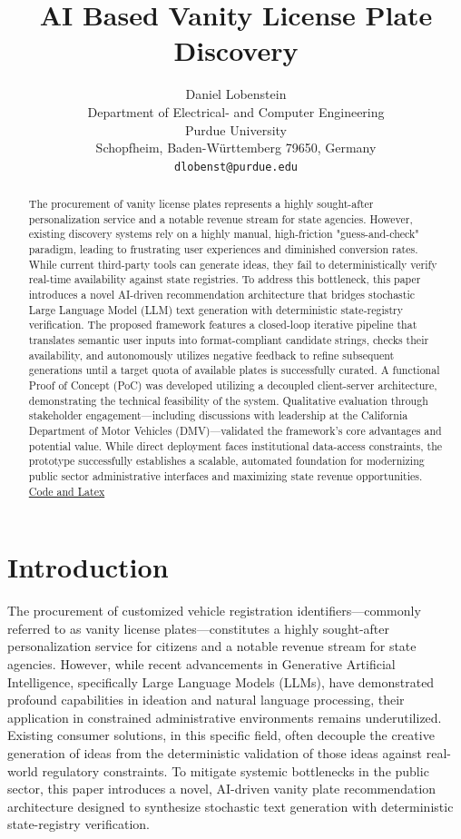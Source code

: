 \documentclass{article} %
\title{AI Based Vanity License Plate Discovery}
\author{Daniel Lobenstein \\
Department of Electrical- and Computer Engineering\\
Purdue University\\
Schopfheim, Baden-Württemberg 79650, Germany \\
\texttt{dlobenst@purdue.edu} 
}
\begin{document}
\maketitle

\begin{abstract}
The procurement of vanity license plates represents a highly sought-after personalization service and a notable revenue stream for state agencies. However, existing discovery systems rely on a highly manual, high-friction "guess-and-check" paradigm, leading to frustrating user experiences and diminished conversion rates. While current third-party tools can generate ideas, they fail to deterministically verify real-time availability against state registries. To address this bottleneck, this paper introduces a novel AI-driven recommendation architecture that bridges stochastic Large Language Model (LLM) text generation with deterministic state-registry verification. The proposed framework features a closed-loop iterative pipeline that translates semantic user inputs into format-compliant candidate strings, checks their availability, and autonomously utilizes negative feedback to refine subsequent generations until a target quota of available plates is successfully curated. A functional Proof of Concept (PoC) was developed utilizing a decoupled client-server architecture, demonstrating the technical feasibility of the system. Qualitative evaluation through stakeholder engagement—including discussions with leadership at the California Department of Motor Vehicles (DMV)—validated the framework's core advantages and potential value. While direct deployment faces institutional data-access constraints, the prototype successfully establishes a scalable, automated foundation for modernizing public sector administrative interfaces and maximizing state revenue opportunities.
\newline
\href{https://github.com/lobendan/ai_project}{Code and Latex}
\end{abstract}

\section{Introduction}

The procurement of customized vehicle registration identifiers—commonly referred to as vanity license plates—constitutes a highly sought-after personalization service for citizens and a notable revenue stream for state agencies. However, while recent advancements in Generative Artificial Intelligence, specifically Large Language Models (LLMs), have demonstrated profound capabilities in ideation and natural language processing, their application in constrained administrative environments remains underutilized.\cite{ai_public_sector} Existing consumer solutions, in this specific field, often decouple the creative generation of ideas from the deterministic validation of those ideas against real-world regulatory constraints. To mitigate systemic bottlenecks in the public sector, this paper introduces a novel, AI-driven vanity plate recommendation architecture designed to synthesize stochastic text generation with deterministic state-registry verification.
\end{document}
